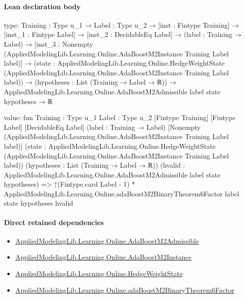 \documentclass[10pt]{article}
\begin{document}
\paragraph{Lean declaration body}
\begin{ReviewVerbatim}
type:
{Training : Type u_1} →
  {Label : Type u_2} →
    [inst : Fintype Training] →
      [inst_1 : Fintype Label] →
        [inst_2 : DecidableEq Label] →
          (label : Training → Label) →
            [inst_3 : Nonempty (AppliedModelingLib.Learning.Online.AdaBoostM2Instance Training Label label)] →
              (state :
                  AppliedModelingLib.Learning.Online.HedgeWeightState
                    (AppliedModelingLib.Learning.Online.AdaBoostM2Instance Training Label label)) →
                (hypotheses : List (Training → Label → ℝ)) →
                  AppliedModelingLib.Learning.Online.AdaBoostM2Admissible label state hypotheses → ℝ

value:
fun {Training : Type u_1} {Label : Type u_2} [Fintype Training] [Fintype Label] [DecidableEq Label]
    (label : Training → Label) [Nonempty (AppliedModelingLib.Learning.Online.AdaBoostM2Instance Training Label label)]
    (state :
      AppliedModelingLib.Learning.Online.HedgeWeightState
        (AppliedModelingLib.Learning.Online.AdaBoostM2Instance Training Label label))
    (hypotheses : List (Training → Label → ℝ))
    (hvalid : AppliedModelingLib.Learning.Online.AdaBoostM2Admissible label state hypotheses) =>
  ↑(Fintype.card Label - 1) *
    AppliedModelingLib.Learning.Online.adaBoostM2BinaryTheorem6Factor label state hypotheses hvalid
\end{ReviewVerbatim}

\paragraph{Direct retained dependencies}
\begin{itemize}\raggedright
\item \hyperlink{governing-declaration-759a42c12a885c8e}{Applied\allowbreak{}Modeling\allowbreak{}Lib.\allowbreak{}Learning.\allowbreak{}Online.\allowbreak{}Ada\allowbreak{}Boost\allowbreak{}M2\allowbreak{}Admissible}
\item \hyperlink{governing-declaration-ffa271cbdc97d5db}{Applied\allowbreak{}Modeling\allowbreak{}Lib.\allowbreak{}Learning.\allowbreak{}Online.\allowbreak{}Ada\allowbreak{}Boost\allowbreak{}M2\allowbreak{}Instance}
\item \hyperlink{library-prerequisite-8196082d02788389}{Applied\allowbreak{}Modeling\allowbreak{}Lib.\allowbreak{}Learning.\allowbreak{}Online.\allowbreak{}Hedge\allowbreak{}Weight\allowbreak{}State}
\item \hyperlink{governing-declaration-0026254c1629db4e}{Applied\allowbreak{}Modeling\allowbreak{}Lib.\allowbreak{}Learning.\allowbreak{}Online.\allowbreak{}ada\allowbreak{}Boost\allowbreak{}M2\allowbreak{}Binary\allowbreak{}Theorem6\allowbreak{}Factor}
\end{itemize}
\hypertarget{governing-declaration-7e37ebcbc41fa4e2}{}
\end{document}

